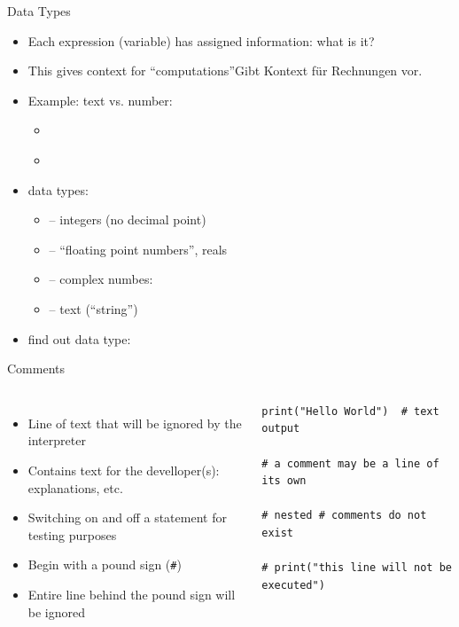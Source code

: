 \begin{frame}{Data Types}
%
\begin{itemize}
\item Each expression (\zB variable) has assigned information: what is it?
\item This gives context for \enquote{computations}Gibt Kontext für Rechnungen vor.
\item Example: text vs. number:
	\begin{itemize}
	\item {} \thus~ 
	\item {} \thus~ 
	\end{itemize}
\item data types:
	\begin{itemize}
	\item {} -- integers (no decimal point)
	\item {} -- \enquote{floating point numbers}, reals
	\item {} -- complex numbes: 
	\item {} -- text (\enquote{string})
	\end{itemize}
\item find out data type: 
\end{itemize}
%
\end{frame}


\begin{frame}[fragile]{Comments}
%
\begin{columns}[T]
\begin{itemize}
\item Line of text that will be ignored by the interpreter
\item Contains text for the develloper(s): explanations, etc.
\item Switching on and off a statement for testing purposes
\item Begin with a pound sign (\texttt{\#})
\item Entire line behind the pound sign will be ignored
\end{itemize}
%
\begin{codebox}
\begin{verbatim}
print("Hello World")  # text output

# a comment may be a line of its own

# nested # comments do not exist

# print("this line will not be executed")
\end{verbatim}
\end{codebox}
\end{columns}
%
\end{frame}
